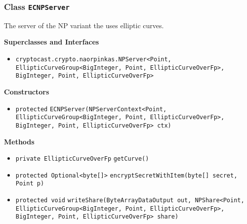 \subsubsection{Class \lstinline|ECNPServer|}
The server of the NP variant the uses elliptic curves. \\
\noindent\begin{minipage}[t]{5cm}
\vspace{0.3em}
\hspace*{2em}
\vspace{0.3em}
\end{minipage}



\textbf{\sffamily Superclasses and Interfaces}
\begin{itemize}
\item \lstinline|cryptocast.crypto.naorpinkas.NPServer<Point, EllipticCurveGroup<BigInteger, Point, EllipticCurveOverFp>, BigInteger, Point, EllipticCurveOverFp>|
\end{itemize}


\textbf{\sffamily Constructors}
\begin{itemize}
\item \lstinline|protected| \lstinline|ECNPServer|\lstinline|(NPServerContext<Point, EllipticCurveGroup<BigInteger, Point, EllipticCurveOverFp>, BigInteger, Point, EllipticCurveOverFp> ctx)| \\[-0.6em]




\end{itemize}


\textbf{\sffamily Methods}
\begin{itemize}
\item \lstinline|private EllipticCurveOverFp| \lstinline|getCurve|\lstinline|()| \\[-0.6em]




\item \lstinline|protected Optional<byte[]>| \lstinline|encryptSecretWithItem|\lstinline|(byte[] secret, Point p)| \\[-0.6em]




\item \lstinline|protected void| \lstinline|writeShare|\lstinline|(ByteArrayDataOutput out, NPShare<Point, EllipticCurveGroup<BigInteger, Point, EllipticCurveOverFp>, BigInteger, Point, EllipticCurveOverFp> share)| \\[-0.6em]




\end{itemize}

